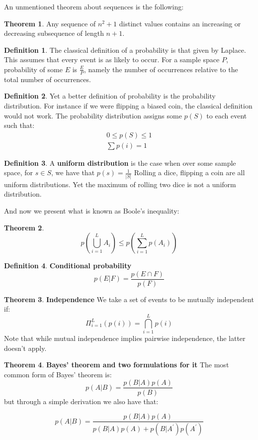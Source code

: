 \documentclass[titlepage]{article}
\theoremstyle{definition}
\newtheorem{theorem}{Theorem}[section]
\newtheorem{definition}{Definition}
\numberwithin{equation}{subsection}
\numberwithin{remark}{subsection}
\begin{document}
An unmentioned theorem about sequences is the following:

\begin{theorem}
Any sequence of $n^{2}+1$ distinct values contains an increasing or decreasing subsequence of length $n+1$.
\end{theorem}

\begin{definition}
The classical definition of a probability is that given by Laplace. This assumes that every event is as likely to occur. For a sample space $P$, probability of some $E$ is $\frac{E}{P}$, namely the number of occurrences relative to the total number of occurrences.
\end{definition}

\begin{definition}
Yet a better definition of probability is the probability distribution. For instance if we were flipping a biased coin, the classical definition would not work. The probability distribution assigns some $p(S)$ to each event such that:
\begin{align*}
    0 \leq p(S) \leq 1\\
    \sum p(i) = 1
\end{align*}
\end{definition}

\begin{definition}
A \textbf{uniform distribution} is the case when over some sample space, for $s \in S$, we have that $p(s) = \frac{1}{|S|}$ Rolling a dice, flipping a coin are all uniform distributions. Yet the maximum of rolling two dice is not a uniform distribution. 
\end{definition}

And now we present what is known as Boole's inequality:
\begin{theorem}
$$p(\bigcup_{i=1}^{L}A_{i}) \leq p(\sum_{i=1}^{L}p(A_{i}))$$
\end{theorem}

\begin{definition}\textbf{Conditional probability}
$$p(E|F) = \frac{p(E\cap F)}{p(F)}$$
\end{definition}


\begin{theorem}\textbf{Independence}
We take a set of events to be mutually independent if: $$\Pi_{i=1}^{L}(p(i)) = \bigcap_{i=1}^{L}p(i)$$
Note that while mutual independence implies pairwise independence, the latter doesn't apply. 
\end{theorem}

\begin{theorem}\textbf{Bayes' theorem and two formulations for it}
The most common form of Bayes' theorem is:
$$p(A|B) = \frac{p(B|A)p(A)}{p(B)}$$ but through a simple derivation we also have that: 

$$ p(A|B) = \frac{p(B|A)p(A)}{p(B|A)p(A) + p(B|A^{'})p(A^{'})} $$
\end{theorem}
\end{document}
